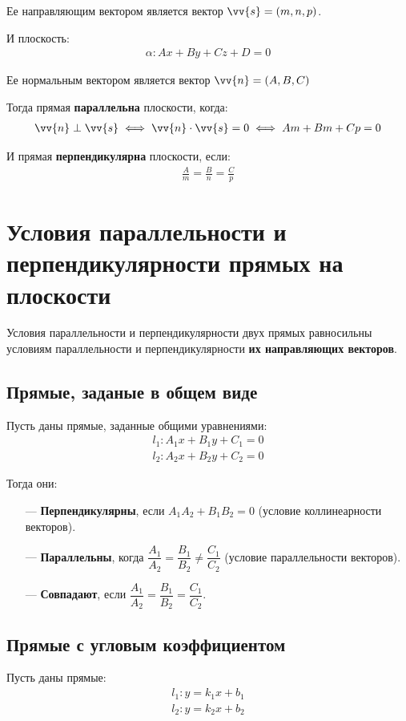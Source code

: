 \documentclass[a4paper,12pt]{extbook}
\theoremstyle{numbered}
\theoremstyle{named}
\theoremstyle{named}
\theoremstyle{named}
\begin{document}
Ее направляющим вектором является вектор \(\vv{s} = (m, n, p)\).

И плоскость:
\begin{gather*}
    \alpha: Ax + By + Cz + D = 0
\end{gather*}

Ее нормальным вектором является вектор \(\vv{n} = (A, B, C)\)

Тогда прямая \textbf{параллельна} плоскости, когда:
\begin{gather*}
    \vv{n} \perp \vv{s} \iff \vv{n} \cdot \vv{s} = 0 \iff Am + Bm + Cp = 0
\end{gather*}

И прямая \textbf{перпендикулярна} плоскости, если:
\begin{gather*}
    \frac{A}{m} = \frac{B}{n} = \frac{C}{p}
\end{gather*}

\section{Условия параллельности и перпендикулярности прямых на плоскости}
\label{sec:parallel_perpendicular_lines}

Условия параллельности и перпендикулярности двух прямых равносильны условиям параллельности и перпендикулярности \textbf{их направляющих векторов}.

\subsection*{Прямые, заданые в общем виде}
Пусть даны прямые, заданные общими уравнениями:
\begin{gather*}
    l_1: A_1x + B_1y + C_1 = 0 \\
    l_2: A_2x + B_2y + C_2 = 0
\end{gather*}

Тогда они:
\begin{itemize}
    \item[—]{\textbf{Перпендикулярны}, если \(A_1A_2 + B_1B_2 = 0\) (условие коллинеарности векторов).}
    \item[—]{\textbf{Параллельны}, когда \(\dfrac{A_1}{A_2} = \dfrac{B_1}{B_2} \neq \dfrac{C_1}{C_2}\) (условие параллельности векторов).}
    \item[—]{\textbf{Совпадают}, если \(\dfrac{A_1}{A_2} = \dfrac{B_1}{B_2} = \dfrac{C_1}{C_2}\).}
\end{itemize}

\subsection*{Прямые с угловым коэффициентом}
Пусть даны прямые:
\begin{gather*}
    l_1: y = k_1x + b_1 \\
    l_2: y = k_2x + b_2
\end{gather*}
\end{document}
